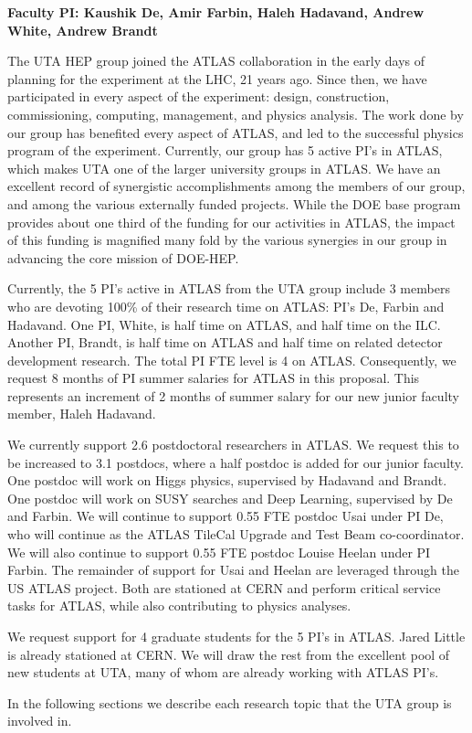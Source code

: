 
\textbf{Faculty PI: Kaushik De, Amir Farbin, Haleh Hadavand, Andrew White, Andrew Brandt}

The UTA HEP group joined the ATLAS collaboration in the early days of planning for the 
experiment at the LHC, 21 years ago. Since then, we have participated in every aspect 
of the experiment: design, construction, commissioning, computing, management, and 
physics analysis. 
The work done by our group has benefited every aspect of ATLAS, and led to the 
successful physics program of the experiment. 
Currently, our group has 5 active PI's in ATLAS, which makes UTA one of the larger 
university groups in ATLAS. We have an excellent record of synergistic accomplishments 
among the members of our group, and among the various externally funded projects. 
While the DOE base program provides about one third of the funding for our activities in ATLAS, the impact of 
this funding is magnified many fold by the various synergies in our group  
in advancing the core mission of DOE-HEP.

Currently, the 5 PI's active in ATLAS from the UTA group include 3 members who are 
devoting 100\% of their research time on ATLAS: PI's De, Farbin and Hadavand. 
One PI, White, is half time on ATLAS, and half time on the ILC. 
Another PI, Brandt, is half time on ATLAS and half time on related detector development research. 
The total PI FTE level is 4 on ATLAS. Consequently, we request 8 months of PI summer salaries for ATLAS in 
this proposal. This represents an increment of 2 months of summer salary for our 
new junior faculty member, Haleh Hadavand.

We currently support 2.6 postdoctoral researchers in ATLAS. We request this to be increased to 3.1 postdocs, 
where a half postdoc is added for our junior faculty. One postdoc will work on Higgs physics, 
supervised by Hadavand and Brandt. One postdoc will work on SUSY searches and Deep Learning, supervised
by De and Farbin. We will continue to support 0.55 FTE postdoc Usai under PI De, who will
continue as the ATLAS TileCal Upgrade and Test Beam co-coordinator. We will also continue 
to support 0.55 FTE postdoc Louise Heelan under PI Farbin. The remainder of support for Usai and Heelan are 
leveraged through the US ATLAS project. Both are stationed at CERN and perform critical service tasks
for ATLAS, while also contributing to physics analyses.

We request support for 4 graduate students for the 5 PI's in ATLAS. Jared Little is already stationed at CERN. We will draw the rest from the excellent
pool of new students at UTA, many of whom are already working with ATLAS PI's.

In the following sections we describe each research topic that the UTA group is involved in.